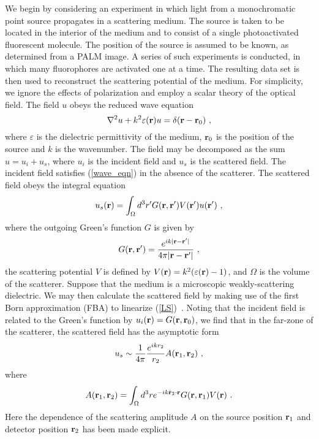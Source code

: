 \documentclass[prl,twocolumn]{revtex4-1}
\newcommand{\lap}{\nabla^2}
\newcommand{\Br}{{\bf r}}
\begin{document}
We begin by considering an experiment in which light from a monochromatic point source propagates in a scattering medium. The source is taken to be located in the interior of the medium and to consist of a single photoactivated fluorescent molecule. The position of the source is assumed to be known, as determined from a PALM image. A series of such experiments is conducted, in which many fluorophores are activated one at a time. The resulting data set is then used to reconstruct the scattering potential of the medium. For simplicity, we ignore the effects of polarization and employ a scalar theory of the optical field. The field $u$ obeys the reduced wave equation
\begin{equation}
\label{wave_eqn}
\lap u + k^2\varepsilon(\Br) u = \delta(\Br-\Br_0) \ ,
\end{equation}
where $\varepsilon$ is the dielectric permittivity of the medium, $\Br_0$ is the position of the source and $k$ is the wavenumber. The field may be decomposed as the sum $u=u_i+u_s$, where $u_i$ is the incident field and $u_s$ is the scattered field. The incident field satisfies (\ref{wave_eqn}) in the absence of the scatterer. The scattered field obeys the integral equation
\begin{equation}
\label{LS}
u_s(\Br) =  \int_\Omega d^3r' G(\Br,\Br') V(\Br') u(\Br') \ ,
\end{equation}
where the outgoing Green's function $G$ is given by
\begin{equation}
\label{eq:G0}
G(\Br,\Br')=\frac{e^{ik|\Br-\Br'|}}{4\pi|\Br-\Br'|} \ ,
\end{equation}
the scattering potential $V$ is defined by $V(\Br)=k^2(\varepsilon(\Br)-1)$, and $\Omega$ is the volume of the scatterer.
Suppose that the medium is a microscopic weakly-scattering dielectric. We may then calculate the scattered field by making use of the first Born approximation (FBA) to linearize (\ref{LS})~\cite{Born-Wolf}. Noting that the incident field is related to the Green's function by $u_i(\Br)=G(\Br,\Br_0)$, we find that in the far-zone of the scatterer, the scattered field has the asymptotic form
\begin{equation}
u_s \sim \frac{1}{4\pi}\frac{e^{ik r_2}}{r_2} A(\Br_1,\Br_2) \ ,
\end{equation} 
where
\begin{equation}
\label{def_A}
A(\Br_1,\Br_2) = \int_\Omega d^3r e^{-ik\hat\Br_2\cdot\Br}G(\Br,\Br_1)V(\Br) \ .
\end{equation}
Here the dependence of the scattering amplitude $A$ on the source position $\Br_1$
and detector position $\Br_2$ has been made explicit. 
\end{document}
